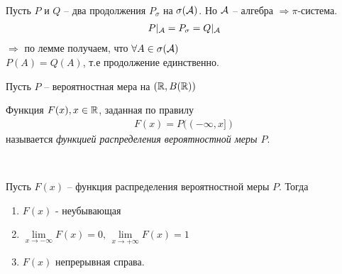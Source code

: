 \begin{corollary}~

	Пусть $P$ и $Q$ -- два продолжения $P_\sigma$ на $\sigma(\mathcal{A})$. 
	Но $\mathcal{A}$ -- алгебра $\Rightarrow \pi$-система.
	\begin{align*}
		P |_{\mathcal{A}} = P_\sigma = Q |_{\mathcal{A}}
	\end{align*}
	$\Rightarrow$ по лемме получаем, что $\forall A \in \sigma(\mathcal{A})$\\
	$P(A) = Q(A)$, т.е продолжение единственно.\\
\end{corollary}

Пусть $P$ -- вероятностная мера на $(\mathbb{R}, B(\mathbb{R}))$

\begin{definition}
	Функция $F(x), x \in \mathbb{R}$, заданная по правилу
	\begin{align*}
		F(x) = P((-\infty, x])
	\end{align*}
	называется \emph{функцией распределения вероятностной меры $P$}.
\end{definition}

\begin{lemma}~

	Пусть $F(x)$ -- функция распределения вероятностной меры $P$. Тогда
	\begin{enumerate}
		\item 
			$F(x)$ - неубывающая

		\item 
			$\lim\limits_{x \rightarrow -\infty} F(x) = 0, \, 
			\lim\limits_{x \rightarrow +\infty} F(x) = 1$

		\item 
			$F(x)$ непрерывная справа.
	\end{enumerate}
\end{lemma}

